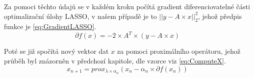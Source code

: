 \documentclass[FM,BP]{tulthesis}
\newcounter{Vzorce}
\begin{document}
Za pomoci těchto údajů se v každém kroku počítá gradient diferenciovatelné části optimalizační úlohy LASSO, v našem případě je to $\left|\right|y-A \times x\left|\right|_{2}^{2}$, jehož předpis funkce je \ref{eq:GradientLASSO}.
\begin{equation} \label{eq:GradientLASSO}  \tag{Vzorec \theVzorce}
\partial f(x) = -2 \times A^T \times (y-A \times x)
\end{equation}

Poté se již spočítá nový vektor dat $x$ za pomoci proximálního operátoru, jehož průběh byl znázorněn v předchozí kapitole, dle vzorce viz \ref{eq:ComputeX}. 
\begin{equation} \label{eq:ComputeX}  \tag{Vzorec \theVzorce}
x_{n+1} = prox_{\lambda \times \alpha _{n}}(x_{n}- \alpha _{n} \times \partial f(x_{n}))
\end{equation}
\end{document}
